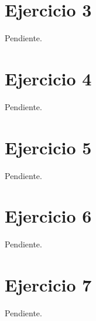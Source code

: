 \documentclass[a4paper,10pt,twoside]{article}
\begin{document}
\section{Ejercicio 3}

Pendiente.




\section{Ejercicio 4}

Pendiente.




\section{Ejercicio 5}

Pendiente.




\section{Ejercicio 6}

Pendiente.




\section{Ejercicio 7}

Pendiente.


\end{document}
